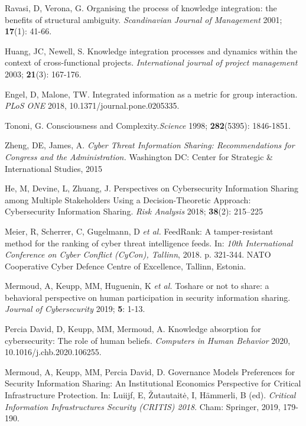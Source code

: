 \documentclass[unnumsec,webpdf,contemporary,large]{oup-authoring-template}%
\theoremstyle{thmstyleone}%
\theoremstyle{thmstyletwo}%
\theoremstyle{thmstylethree}%
\begin{document}
\begin{thebibliography}{10}
Ravasi, D, Verona, G. Organising the process of knowledge integration: the benefits of structural ambiguity. {\em Scandinavian Journal of Management} 2001; {\bf17}(1): 41-66.

Huang, JC, Newell, S. Knowledge integration processes and dynamics within the context of cross-functional projects. {\em International journal of project management} 2003; {\bf21}(3): 167-176.

Engel, D, Malone, TW. Integrated information as a metric for group interaction. {\em PLoS ONE} 2018, 10.1371/journal.pone.0205335.

Tononi, G. Consciousness and Complexity.{\em Science} 1998; {\bf 282}(5395): 1846-1851.

Zheng, DE, James, A. {\em Cyber Threat Information Sharing: Recommendations for Congress and
the Administration.} Washington DC: Center for Strategic \& International Studies, 2015

He, M, Devine, L, Zhuang, J. Perspectives on Cybersecurity Information Sharing
among Multiple Stakeholders Using a Decision-Theoretic Approach: Cybersecurity Information Sharing. {\em Risk Analysis} 2018; {\bf 38}(2): 215–225

Meier, R, Scherrer, C, Gugelmann, D {\em et al.} FeedRank: A tamper-resistant method for the ranking of cyber threat intelligence feeds. In: {\em 10th
International Conference on Cyber Conflict (CyCon), Tallinn}, 2018. p. 321-344. NATO Cooperative Cyber Defence Centre of Excellence, Tallinn, Estonia.

Mermoud, A, Keupp, MM, Huguenin, K {\em et al.} Toshare or not to share: a behavioral perspective on human participation in security
information sharing. {\em Journal of Cybersecurity} 2019; {\bf 5}: 1-13.

Percia David, D, Keupp, MM, Mermoud, A. Knowledge absorption for cybersecurity: The role of human beliefs. {\em Computers in Human Behavior} 2020, 10.1016/j.chb.2020.106255.

Mermoud, A, Keupp, MM, Percia David, D. Governance Models Preferences for Security Information Sharing: An Institutional Economics Perspective for Critical
Infrastructure Protection. In: Luiijf, E, \v{Z}utautait\.{e}, I, H\"ammerli, B (ed). {\em Critical Information Infrastructures Security (CRITIS) 2018}. Cham: Springer, 2019, 179-190.


\end{thebibliography}
\end{document}
